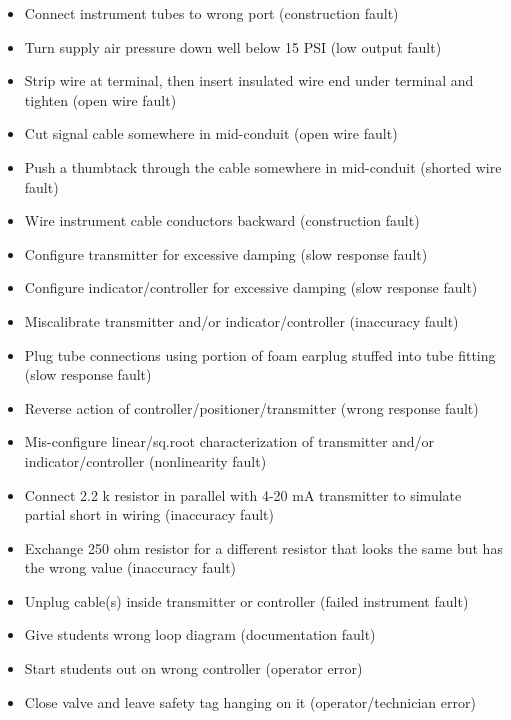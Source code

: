 \begin{itemize}
\goodbreak
\item{} Connect instrument tubes to wrong port (construction fault)
\item{} Turn supply air pressure down well below 15 PSI (low output fault)
\item{} Strip wire at terminal, then insert insulated wire end under terminal and tighten (open wire fault)
\item{} Cut signal cable somewhere in mid-conduit (open wire fault)
\item{} Push a thumbtack through the cable somewhere in mid-conduit (shorted wire fault)
\item{} Wire instrument cable conductors backward (construction fault)
\item{} Configure transmitter for excessive damping (slow response fault)
\item{} Configure indicator/controller for excessive damping (slow response fault)
\item{} Miscalibrate transmitter and/or indicator/controller (inaccuracy fault)
\item{} Plug tube connections using portion of foam earplug stuffed into tube fitting (slow response fault)
\item{} Reverse action of controller/positioner/transmitter (wrong response fault)
\item{} Mis-configure linear/sq.root characterization of transmitter and/or indicator/controller (nonlinearity fault)
\item{} Connect 2.2 k resistor in parallel with 4-20 mA transmitter to simulate partial short in wiring (inaccuracy fault)
\item{} Exchange 250 ohm resistor for a different resistor that looks the same but has the wrong value (inaccuracy fault) 
\item{} Unplug cable(s) inside transmitter or controller (failed instrument fault)
\item{} Give students wrong loop diagram (documentation fault)
\item{} Start students out on wrong controller (operator error)
\item{} Close valve and leave safety tag hanging on it (operator/technician error)
\end{itemize}







\vfil \eject

